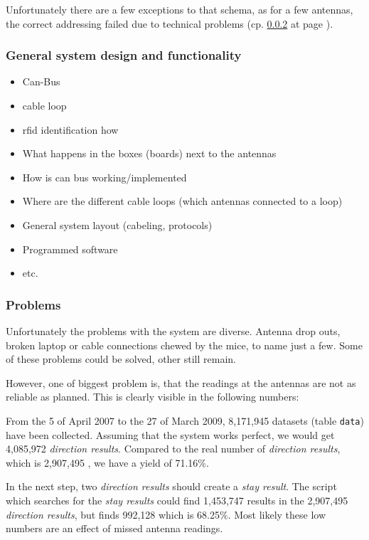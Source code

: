 Unfortunately there are a few exceptions to that schema, as for a few antennas, the correct addressing failed due to technical problems (cp. \ref{subsubsec:problems} at page \pageref{subsubsec:problems}).

\subsubsection{General system design and functionality}
\label{subsubsec:generalsystem}

\begin{itemize}
  \item Can-Bus
  \item cable loop
  \item rfid identification how
  \item What happens in the boxes (boards) next to the antennas
  \item How is can bus working/implemented
  \item Where are the different cable loops (which antennas connected to a loop)
  \item General system layout (cabeling, protocols)
  \item Programmed software
  \item etc. 
\end{itemize}

\subsubsection{Problems}
\label{subsubsec:problems}

Unfortunately the problems with the system are diverse. Antenna drop outs, broken laptop or cable connections chewed by the mice, to name just a few. Some of these problems could be solved, other still remain.

However, one of biggest problem is, that the readings at the antennas are not as reliable as planned. This is clearly visible in the following numbers:

From the 5 of April 2007 to the 27 of March 2009, 8,171,945 datasets (table \lstinline|data|) have been collected. Assuming that the system works perfect, we would get 4,085,972 \textit{direction results}. Compared to the real number of \textit{direction results}, which is 2,907,495 , we have a yield of 71.16\%.

In the next step, two \textit{direction results} should create a \textit{stay result}. The script which searches for the \textit{stay results} could find 1,453,747 results in the 2,907,495 \textit{direction results}, but finds 992,128 which is 68.25\%. Most likely these low numbers are an effect of missed antenna readings. 

